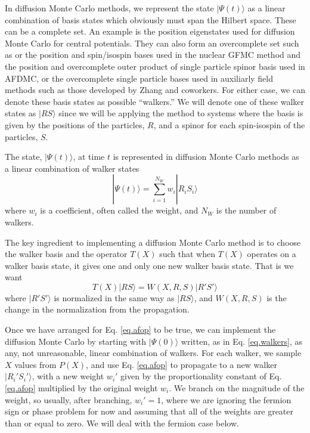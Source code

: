  In diffusion Monte Carlo methods, we represent the state $|\Psi(t)\rangle$
 as a linear combination of basis states which obviously must span the
 Hilbert space. These can be a complete set. An example is the position
 eigenstates used for diffusion Monte Carlo for central potentials.
 They can also form an overcomplete set such as
 or the position and spin/isospin bases used in the nuclear GFMC
 method and the position and
 overcomplete outer product of single particle
 spinor basis used in AFDMC, or the
 overcomplete single particle bases used in auxiliarly field methods
 such as those developed by Zhang and coworkers. For either case, we
 can denote these basis states as possible ``walkers.'' We will denote
 one of these walker states
 as $|RS\rangle$ since we will be applying the method to
 systems where the basis is given by the positions of the particles, $R$,
 and a spinor for each spin-isospin of the particles, $S$.
 
 The state,
 $|\Psi(t)\rangle$, at
 time $t$ is represented in diffusion Monte Carlo methods as a
 linear combination of walker states
 \begin{equation}
 \label{eq.walkers}
 |\Psi(t)\rangle = \sum_{i=1}^{N_W} w_i |R_i S_i\rangle
 \end{equation}
 where $w_i$ is a coefficient, often called the weight, and $N_W$ is the
 number of walkers.
 
 The key ingredient to implementing a diffusion Monte Carlo method is
 to choose the walker basis and the operator $T(X)$ such that when
 $T(X)$ operates on a walker basis state, it gives one and only one
 new walker basis state. That is we want
 \begin{equation}
 \label{eq.afop}
 T(X) |R S\rangle = W(X,R,S) |R' S'\rangle
 \end{equation}
 where $|R' S'\rangle$ is normalized in the same way as $|RS\rangle$,
 and $W(X,R,S)$ is the change in the normalization from the propagation.
 
 Once we have arranged for Eq. \ref{eq.afop} to be true, we can implement
 the diffusion Monte Carlo by starting with $|\Psi(0)\rangle$ written, as
 in Eq. \ref{eq.walkers}, as any, not
 unreasonable, linear combination of walkers. For each walker, we sample
 $X$ values from $P(X)$, and use Eq. \ref{eq.afop} to propagate to a new
 walker $|R_i' S_i'\rangle$, with a new weight $w_i'$
 given by the proportionality
 constant of Eq. \ref{eq.afop} multiplied by
 the original weight $w_i$. We branch on the magnitude of the weight,
 so usually, after branching, $w_i'=1$, where we are ignoring the
 fermion sign or phase problem for now and assuming that all of the
 weights are greater than or equal to zero. We will deal with the
 fermion case below.
 
